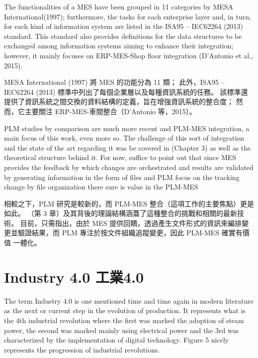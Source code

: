 \fontsize{14pt}{2.5pt}\sectionef 
{The functionalities of a MES have been grouped in 11 categories by MESA International(1997); furthermore, the tasks for each enterprise layer and, in turn, for each kind of information system are listed in the ISA95 – IEC62264 (2013) standard. This standard also provides definitions for the data structures to be exchanged among information systems aiming to enhance their integration; however, it mainly focuses on ERP-MES-Shop floor integration (D’Antonio et al., 2015).
}

\fontsize{14pt}{5pt}\sectionef
 {MESA International (1997) 將 MES 的功能分為 11 類； 此外，ISA95 – IEC62264 (2013) 標準中列出了每個企業層以及每種資訊系統的任務。 該標準還提供了資訊系統之間交換的資料結構的定義，旨在增強資訊系統的整合度； 然而，它主要關注 ERP-MES-車間整合（D’Antonio 等，2015）。}\\[15pt]


\fontsize{14pt}{2.5pt}\sectionef 
{PLM studies by comparison are much more recent and PLM-MES integration, a main focus of this work, even more so. The challenge of this sort of integration and the state of the art regarding it was be covered in (Chapter 3) as well as the theoretical structure behind it. For now, suffice to point out that since MES provides the feedback by which changes are orchestrated and results are validated by generating information in the form of files and PLM focus on the tracking change by file organization there sure is value in the PLM-MES 

}

\fontsize{14pt}{5pt}\sectionef
 {相較之下，PLM 研究是較新的，而 PLM-MES 整合（這項工作的主要焦點）更是如此。 （第 3 章）及其背後的理論結構涵蓋了這種整合的挑戰和相關的最新技術。 目前，只需指出，由於 MES 提供回饋，透過產生文件形式的資訊來編排變更並驗證結果，而 PLM 專注於按文件組織追蹤變更，因此 PLM-MES 確實有價值
一體化。}\\[15pt]

\section{Industry 4.0 工業4.0}

\fontsize{14pt}{2.5pt}\sectionef 
{The term Industry 4.0 is one mentioned time and time again in modern literature as the next or current step in the evolution of production. It represents what is the 4th industrial revolution where the first was marked the adoption of steam power, the second was marked mainly using electrical power and the 3rd was characterized by the implementation of digital technology. Figure 5 nicely represents the progression of industrial revolutions.


}

